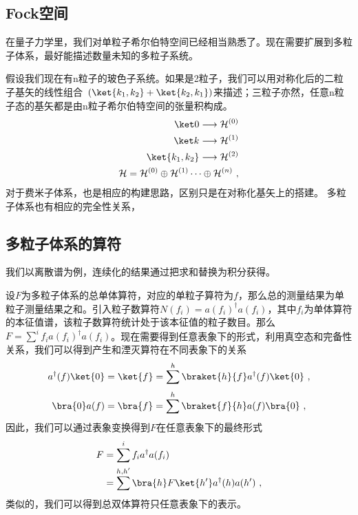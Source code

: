 \subsection{Fock空间}
在量子力学里，我们对单粒子希尔伯特空间已经相当熟悉了。现在需要扩展到多粒子体系，最好能描述数量未知的多粒子系统。

假设我们现在有n粒子的玻色子系统。如果是2粒子，我们可以用对称化后的二粒子基矢的线性组合~$(\ket {k_1,k_2}+\ket {k_2,k_1})$来描述；三粒子亦然，任意n粒子态的基矢都是由n粒子希尔伯特空间的张量积构成。
\begin{align}
\ket 0 \longrightarrow \mathcal{H}^{(0)} \\
\ket k \longrightarrow \mathcal{H}^{(1)} \\
\ket {k_1,k_2}\longrightarrow \mathcal{H}^{(2)}\\
\mathcal{H}=\mathcal{H}^{(0)} \oplus \mathcal{H}^{(1)} \cdots \oplus \mathcal{H}^{(n)}~,
\end{align}
对于费米子体系，也是相应的构建思路，区别只是在对称化基矢上的搭建。
多粒子体系也有相应的完全性关系，

\subsection{多粒子体系的算符}
我们以离散谱为例，连续化的结果通过把求和替换为积分获得。

设$ F$为多粒子体系的总单体算符，对应的单粒子算符为$f$，那么总的测量结果为单粒子测量结果之和。引入粒子数算符$N(f_i)=a(f_i)^\dagger a(f_i)$，其中${f_i}$为单体算符的本征值谱，该粒子数算符统计处于该本征值的粒子数目。那么$F=\sum ^i f_i a(f_i)^\dagger a(f_i) $。现在需要得到任意表象下的形式，利用真空态和完备性关系，我们可以得到产生和湮灭算符在不同表象下的关系
\begin{equation}
a^{\dagger}(f)\ket{0}=\ket{f}=\sum ^{h}\braket{h}{f}a^{\dagger}(f)\ket{0}~,
\end{equation}
\begin{equation}
\bra{0}a(f)=\bra{f}=\sum^{h}\braket{f}{h}a(f)\bra{0}~,
\end{equation}
因此，我们可以通过表象变换得到$F$在任意表象下的最终形式
\begin{equation}
\begin{aligned}
F&=\sum^i f_i a^\dagger a(f_i)\\
&=\sum^{h,h'}\bra{h}F\ket{h'}a^\dagger(h)a(h')~,
\end{aligned}
\end{equation}
类似的，我们可以得到总双体算符只任意表象下的表示。

